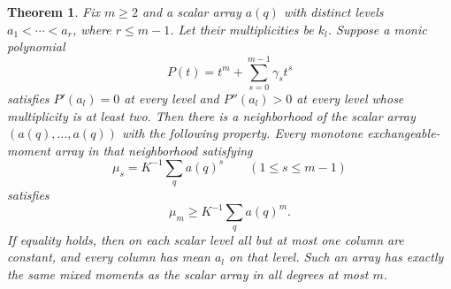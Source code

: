 \documentclass[11pt]{article}
\newtheorem{theorem}{Theorem}
\begin{document}
\begin{theorem}\label{local}
Fix $m\ge2$ and a scalar array $a(q)$ with distinct levels
$a_1<\cdots<a_r$, where $r\le m-1$. Let their multiplicities be $k_l$.
Suppose a monic polynomial
\[
 P(t)=t^m+\sum_{s=0}^{m-1}\gamma_st^s
\]
satisfies $P'(a_l)=0$ at every level and $P''(a_l)>0$ at every level
whose multiplicity is at least two. Then there is a neighborhood of the
scalar array $(a(q),\ldots,a(q))$ with the following property.
Every monotone exchangeable-moment array in that neighborhood satisfying
\[
 \mu_s=K^{-1}\sum_q a(q)^s\qquad(1\le s\le m-1)
\]
satisfies
\[
 \mu_m\ge K^{-1}\sum_q a(q)^m.
\]
If equality holds, then on each scalar level all but at most one column
are constant, and every column has mean $a_l$ on that level. Such an
array has exactly the same mixed moments as the scalar array in all
degrees at most $m$.
\end{theorem}
\end{document}
